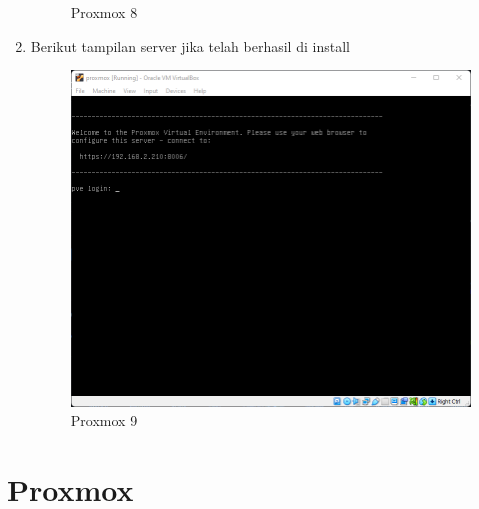\documentclass{article}
\begin{document}
\begin{enumerate}
\begin{figure}[h!]
      \caption{Proxmox 8}
    \end{figure}
    \item Berikut tampilan server jika telah berhasil di install
    \begin{figure}[h!]
      \centering
      \includegraphics[width=0.7\linewidth]{proxmox 9.png}
      \caption{Proxmox 9}
    \end{figure}
  \end{enumerate}
  \newpage

  \section{Proxmox}
\end{document}

